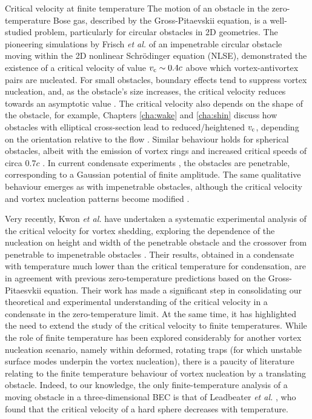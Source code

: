 \begin{chapter}{\label{cha:nonequib}Critical velocity at finite temperature}
The motion of an obstacle in the zero-temperature Bose gas, described by the Gross-Pitaevskii equation, is a well-studied problem, particularly for circular obstacles in 2D geometries.  The pioneering simulations by Frisch {\it et al.} \cite{frisch92} of an impenetrable circular obstacle moving within the 2D nonlinear Schr\"odinger equation (NLSE), demonstrated the existence of a critical velocity of value
$v_{\rm c}\sim 0.4c$ above which vortex-antivortex pairs are nucleated.
For small obstacles, boundary effects tend to suppress vortex nucleation,
and, as the obstacle's size increases, the critical velocity reduces towards an asymptotic value \cite{berloff2000,rica2001,pham2004}.  The critical velocity also depends on the shape of the obstacle, for example, Chapters \ref{cha:wake} and \ref{cha:shin} discuss how obstacles with elliptical cross-section lead to reduced/heightened $v_{\rm c}$, depending on the orientation relative to the flow \cite{stagg_parker_14, stagg_2015b}. Similar behaviour holds for spherical obstacles, albeit with the emission of vortex rings and increased critical speeds of circa $0.7 c$ \cite{winiecki_2000,win01,stagg_parker_14}.
In current condensate experiments \cite{Neely,kwon_moon_14,Raman,Onofrio,Inouye,desbuquois_2012, kwon_2015a,kwon_2015b}, the obstacles are penetrable, corresponding to a Gaussian potential of finite amplitude. The same qualitative behaviour emerges as with impenetrable obstacles,
although the critical velocity and vortex nucleation patterns become modified \cite{saito10}.

Very recently, Kwon {\it et al.} have undertaken
a systematic experimental analysis of the critical velocity for vortex
shedding, exploring the dependence of the nucleation
on height and width of the penetrable obstacle and the crossover
from penetrable to impenetrable obstacles \cite{kwon_2015a}.
Their results, obtained in a condensate with temperature much lower than
the critical temperature for condensation, are
in agreement with previous zero-temperature predictions based on the
Gross-Pitaesvkii equation.
Their work has made a significant step in consolidating our
theoretical and experimental understanding of the critical velocity
in a condensate in the zero-temperature limit.  At the same time,
it has highlighted the need to extend the study
of the critical velocity to finite temperatures.
While the role of finite temperature has been explored considerably for another vortex nucleation scenario, namely within deformed, rotating traps \cite{hodby_2002,abo_shaeer_2002,williams_2002,penckwitt_2002,kasamatsu_2003,lobo_2004} (for which unstable surface modes underpin the vortex nucleation), there is a paucity of literature relating to the finite temperature behaviour of vortex nucleation by a translating obstacle.  Indeed, to our knowledge, the only finite-temperature analysis of a moving obstacle in a three-dimensional BEC is that of Leadbeater {\it et al.}
\cite{leadbeater_2003}, who found that the critical velocity of a hard sphere decreases with temperature.


\end{chapter}
